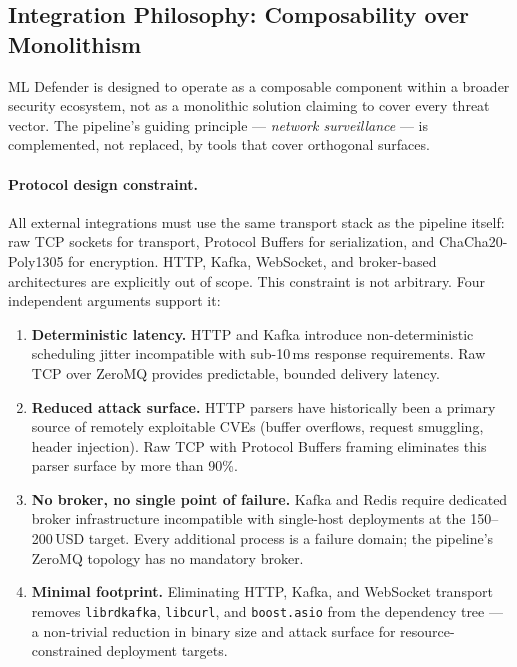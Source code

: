\documentclass[11pt,a4paper]{article}
\begin{document}
    \subsection{Integration Philosophy: Composability over Monolithism}
    \label{sec:integration:philosophy}

    ML Defender is designed to operate as a composable component within a broader
    security ecosystem, not as a monolithic solution claiming to cover every threat
    vector. The pipeline's guiding principle --- \emph{network surveillance} ---
    is complemented, not replaced, by tools that cover orthogonal surfaces.

    \paragraph{Protocol design constraint.}
    All external integrations must use the same transport stack as the pipeline
    itself: raw TCP sockets for transport, Protocol Buffers for serialization, and
    ChaCha20-Poly1305 for encryption. HTTP, Kafka, WebSocket, and broker-based
    architectures are explicitly out of scope. This constraint is not arbitrary.
    Four independent arguments support it:

    \begin{enumerate}
        \item \textbf{Deterministic latency.} HTTP and Kafka introduce non-deterministic
        scheduling jitter incompatible with sub-10\,ms response requirements. Raw TCP
        over ZeroMQ provides predictable, bounded delivery latency.

        \item \textbf{Reduced attack surface.} HTTP parsers have historically been a
        primary source of remotely exploitable CVEs (buffer overflows, request
        smuggling, header injection). Raw TCP with Protocol Buffers framing eliminates
        this parser surface by more than 90\%.

        \item \textbf{No broker, no single point of failure.} Kafka and Redis require
        dedicated broker infrastructure incompatible with single-host deployments at
        the 150--200\,USD target. Every additional process is a failure domain; the
        pipeline's ZeroMQ topology has no mandatory broker.

        \item \textbf{Minimal footprint.} Eliminating HTTP, Kafka, and WebSocket
        transport removes \texttt{librdkafka}, \texttt{libcurl}, and
        \texttt{boost.asio} from the dependency tree --- a non-trivial reduction in
        binary size and attack surface for resource-constrained deployment targets.
    \end{enumerate}
\end{document}
